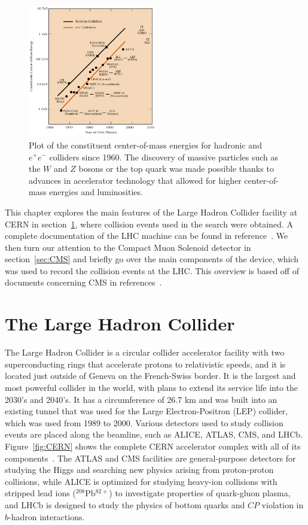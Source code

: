 \begin{figure}[htbp]
  \centering
  \includegraphics[width=0.5\textwidth]{fig/experiment/ecm_livingston.pdf}
  \caption{
    Plot of the constituent center-of-mass energies for hadronic and $e^+e^-$ colliders since 1960.
    The discovery of massive particles such as the $W$ and $Z$ bosons or the top quark was made possible thanks to advances in accelerator technology that allowed for higher center-of-mass energies and luminosities.
  }
  \label{fig:ECMplot}
\end{figure}

This chapter explores the main features of the Large Hadron Collider facility at CERN in section~\ref{sec:LHC}, where collision events used in the search were obtained.
A complete documentation of the LHC machine can be found in reference~\cite{Evans:1129806}.
We then turn our attention to the Compact Muon Solenoid detector in section~\ref{sec:CMS} and briefly go over the main components of the device, which was used to record the collision events at the LHC.
This overview is based off of documents concerning CMS in references~\cite{Chatrchyan:1129810,taylor_2011}.

\section{The Large Hadron Collider}
\label{sec:LHC}

The Large Hadron Collider is a circular collider accelerator facility with two superconducting rings that accelerate protons to relativistic speeds, and it is located just outside of Geneva on the French-Swiss border.
It is the largest and most powerful collider in the world, with plans to extend its service life into the 2030's and 2040's.
It has a circumference of 26.7 km and was built into an existing tunnel that was used for the Large Electron-Positron (LEP) collider, which was used from 1989 to 2000.
Various detectors used to study collision events are placed along the beamline, such as ALICE, ATLAS, CMS, and LHCb.
Figure~\ref{fig:CERN} shows the complete CERN accelerator complex with all of its components~\cite{Mobs:2636343}.
The ATLAS and CMS facilities are general-purpose detectors for studying the Higgs and searching new physics arising from proton-proton collisions, while ALICE is optimized for studying heavy-ion collisions with stripped lead ions ($^{208}$Pb$^{82+}$) to investigate properties of quark-gluon plasma, and LHCb is designed to study the physics of bottom quarks and $CP$ violation in $b$-hadron interactions.

